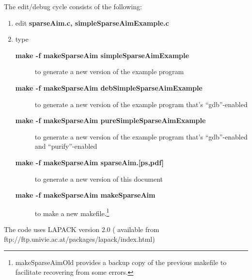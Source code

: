 \documentclass{article}
\begin{document}
The edit/debug cycle consists of the following:
\begin{enumerate}
\item edit {\bf sparseAim.c, simpleSparseAimExample.c}
\item type 
  \begin{description}
  \item[{\bf make -f makeSparseAim simpleSparseAimExample}] to generate 
a new version of the example program 
  \item[{\bf make -f makeSparseAim debSimpleSparseAimExample}] to generate 
a new version of the example program that's ``gdb''-enabled
  \item[{\bf make -f makeSparseAim pureSimpleSparseAimExample}] to generate 
a new version of the example program that's ``gdb''-enabled and ``purify''-enabled
\item[{\bf make -f makeSparseAim sparseAim.[ps,pdf]}] to generate a new version of this document 
\item[{\bf make -f makeSparseAim makeSparseAim}] to make a new makefile.\footnote{makeSparseAimOld provides a backup copy of the previous makefile to facilitate recovering from some errors.}
  \end{description}
\end{enumerate}



The code uses LAPACK version 2.0 ( available from ftp://ftp.univie.ac.at/packages/lapack/index.html)

\appendix
\end{document}

